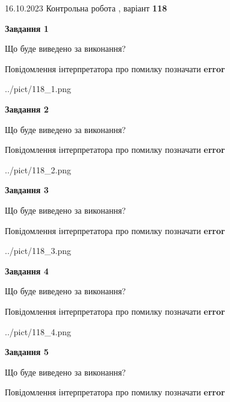 \documentclass[12pt, ukrainian]{article}
\begin{document}
{\Large{16.10.2023 Контрольна робота , варіант  \No \textbf { 118 }\par}}
{
\begin {large}
{\begin {center}\textbf{Завдання 1}\end {center}}\par
Що буде виведено за виконання? \par
Повідомлення інтерпретатора про помилку позначати \textbf{error}

\begin{center}
	{../pict/118_1.png}
\end{center}
\newpage

{\begin {center}\textbf{Завдання 2}\end {center}}\par
Що буде виведено за виконання? \par
Повідомлення інтерпретатора про помилку позначати \textbf{error}

\begin{center}
	{../pict/118_2.png}
\end{center}
\newpage

{\begin {center}\textbf{Завдання 3}\end {center}}\par
Що буде виведено за виконання? \par
Повідомлення інтерпретатора про помилку позначати \textbf{error}

\begin{center}
	{../pict/118_3.png}
\end{center}
\newpage

{\begin {center}\textbf{Завдання 4}\end {center}}\par
Що буде виведено за виконання? \par
Повідомлення інтерпретатора про помилку позначати \textbf{error}

\begin{center}
	{../pict/118_4.png}
\end{center}
\newpage

{\begin {center}\textbf{Завдання 5}\end {center}}\par
Що буде виведено за виконання? \par
Повідомлення інтерпретатора про помилку позначати \textbf{error}


\end{large}}
\end{document}
